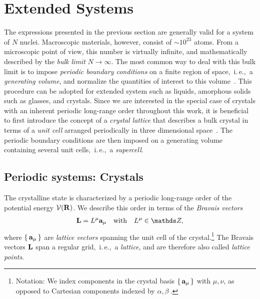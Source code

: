 \section{Extended Systems}
The expressions presented in the previous section are generally valid for a system of $N$ nuclei. Macroscopic materials, however, consist of $\sim 10^{23}$ atoms. From a microscopic point of view, this number is virtually infinite, and mathematically described by the \emph{bulk limit} $N \to \infty$. The most common way to deal with this bulk limit is to impose \emph{periodic boundary conditions} on a finite region of space,~i.\,e.,~a \emph{generating volume}, and normalize the quantities of interest to this volume~\cite{BornHuang}. This procedure can be adopted for extended system such as liquids, amorphous solids such as glasses, and crystals. Since we are interested in the special case of crystals with an inherent periodic long-range order throughout this work, it is beneficial to first introduce the concept of a \emph{crystal lattice} that describes a bulk crystal in terms of a \emph{unit cell} arranged periodically in three dimensional space~\cite{Sands1969}. The periodic boundary conditions are then imposed on a generating volume containing several unit cells,~i.\,e.,~a \emph{supercell}.

\subsection{Periodic systems: Crystals}
{The crystalline state is characterized by a periodic long-range order of the potential energy $\mathcal V ({\bf R})$}. We describe this order in terms of the \emph{Bravais vectors} 
\begin{align}
	{\bf L} = L^\mu {\bf a}_\mu \quad\text{with}\quad L^\mu \in \mathds Z,
	\label{eq:L_Bravais}
\end{align}
where $\set{{\bf a}_\mu}$ are \emph{lattice vectors} spanning the unit cell of the %
crystal.\footnote{Notation: We index components in the crystal basis $\set{{\bf a}_\mu}$ with $\mu, \nu$, as opposed to Cartesian components indexed by $\alpha, \beta~.$} The Bravais vectors $\bf L$ span a regular grid,~i.\,e.,~a \emph{lattice}, and are therefore also called \emph{lattice points}.

